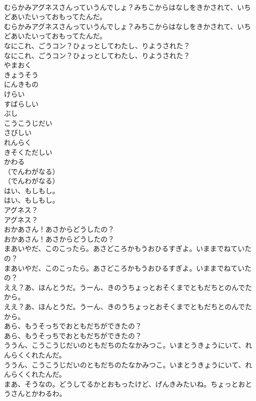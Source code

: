 \documentclass[8pt]{extreport}
\begin{document}
\begin{CJK}{UTF8}{min}
\\	むらかみアグネスさんっていうんでしょ？みちこからはなしをきかされて、いちどあいたいっておもってたんだ。
\\	むらかみアグネスさんっていうんでしょ？みちこからはなしをきかされて、いちどあいたいっておもってたんだ。
\\	なにこれ、ごうコン？ひょっとしてわたし、りようされた？
\\	なにこれ、ごうコン？ひょっとしてわたし、りようされた？
\\	やまおく
\\	きょうそう
\\	にんきもの
\\	けらい
\\	すばらしい
\\	ぶし
\\	こうこうじだい
\\	さびしい
\\	れんらく
\\	きそくただしい
\\	かわる
\\	（でんわがなる）
\\	（でんわがなる）
\\	はい、もしもし。
\\	はい、もしもし。
\\	アグネス？
\\	アグネス？
\\	おかあさん！あさからどうしたの？
\\	おかあさん！あさからどうしたの？
\\	まあいやだ、このこったら。あさどころかもうおひるすぎよ。いままでねていたの？
\\	まあいやだ、このこったら。あさどころかもうおひるすぎよ。いままでねていたの？
\\	ええ？あ、ほんとうだ。うーん、きのうちょっとおそくまでともだちとのんでたから。
\\	ええ？あ、ほんとうだ。うーん、きのうちょっとおそくまでともだちとのんでたから。
\\	あら、もうそっちでおともだちができたの？
\\	あら、もうそっちでおともだちができたの？
\\	ううん、こうこうじだいのともだちのたなかみつこ。いまとうきょうにいて、れんらくくれたんだ。
\\	ううん、こうこうじだいのともだちのたなかみつこ。いまとうきょうにいて、れんらくくれたんだ。
\\	まあ、そうなの。どうしてるかとおもったけど、げんきみたいね。ちょっとおとうさんとかわるわ。

\end{CJK}
\end{document}
